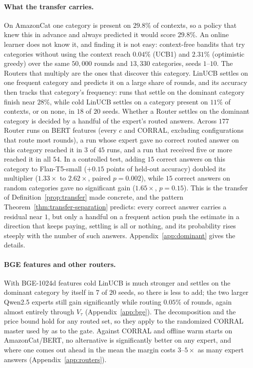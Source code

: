 \documentclass{article}
\theoremstyle{definition}
\theoremstyle{remark}
\theoremstyle{remark}
\begin{document}
\paragraph{What the transfer carries.} On AmazonCat one category is present on
$29.8\%$ of contexts, so a policy that knew this in advance and always
predicted it would score $29.8\%$. An online learner does not know it, and
finding it is not easy: context-free bandits that try categories without
using the context reach $0.04\%$ (UCB1) and $2.31\%$ (optimistic greedy) over
the same $50{,}000$ rounds and $13{,}330$ categories, seeds $1$--$10$. The
Routers that multiply are the ones that discover this category. LinUCB
settles on one frequent category and predicts it on a large share of rounds,
and its accuracy then tracks that category's frequency: runs that settle on
the dominant category finish near $28\%$, while cold LinUCB settles on a
category present on $11\%$ of contexts, or on none, in $18$ of $20$ seeds.
Whether a Router settles on the dominant category is decided by a handful of
the expert's routed answers. Across $177$ Router runs on BERT features (every
$c$ and CORRAL, excluding configurations that route most rounds), a run whose
expert gave no correct routed answer on this category reached it in $3$ of
$45$ runs, and a run that received five or more reached it in all $54$. In a
controlled test, adding $15$ correct answers on this category to
Flan-T5-small ($+0.15$ points of held-out accuracy) doubled its multiplier
($1.33\times$ to $2.62\times$, paired $p=0.002$), while $15$ correct answers on
random categories gave no significant gain ($1.65\times$, $p=0.15$). This is
the transfer of Definition~\ref{prop:transfer} made concrete, and the pattern
Theorem~\ref{thm:transfer-separation} predicts: every correct answer carries a
residual near $1$, but only a handful on a frequent action push the estimate
in a direction that keeps paying, settling is all or nothing, and its
probability rises steeply with the number of such answers. Appendix~\ref{app:dominant} gives
the details.

\paragraph{BGE features and other routers.}
With BGE-1024d features cold LinUCB is much stronger and settles on the
dominant category by itself in $7$ of $20$ seeds, so there is less to add; the
two larger Qwen2.5 experts still gain significantly while routing $0.05\%$ of
rounds, again almost entirely through $V_\tau$ (Appendix~\ref{app:bge}). The
decomposition and the price bound hold for any routed set, so they apply to
the randomized CORRAL master \cite{agarwal2017corralling} used by
\cite{chen2024llmdecision} as to the gate. Against CORRAL and offline warm
starts on AmazonCat/BERT, no alternative is significantly better on any
expert, and where one comes out ahead in the mean the margin costs $3$--$5\times$
as many expert answers (Appendix~\ref{app:routers}).
\end{document}

